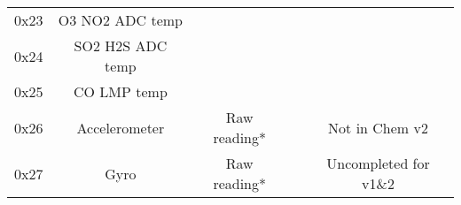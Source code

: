 \begin{table}[h!]
\begin{minipage}{\textwidth}
\begin{tabular}{|c|c|c|c|c|}
        0x23 & O3 NO2 ADC temp & & & \\ \cline{1-2} \cline{5-5}
        0x24 & SO2 H2S ADC temp & & & \\ \cline{1-2} \cline{5-5}
        0x25 & CO LMP temp & & & \\ \hline
        0x26 & Accelerometer & Raw reading* & & Not in Chem v2 \\ \cline{1-4}
        0x27 & Gyro & Raw reading* & & Uncompleted for v1\&2\\ \hline
    \end{tabular}
\end{minipage}
\end{table}